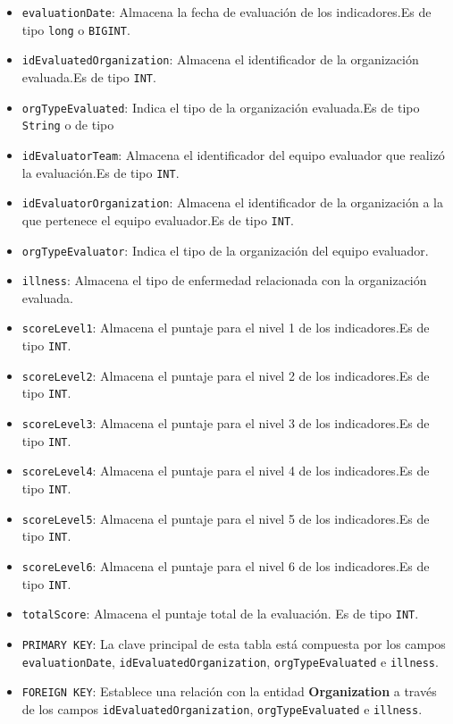 \begin{itemize}
    \begin{itemize}
      \item \texttt{evaluationDate}: Almacena la fecha de evaluación de los indicadores.Es de tipo \texttt{long} o \texttt{BIGINT}.
      \item \texttt{idEvaluatedOrganization}: Almacena el identificador de la organización evaluada.Es de tipo \texttt{INT}.
      \item \texttt{orgTypeEvaluated}: Indica el tipo de la organización evaluada.Es de tipo \texttt{String} o de tipo
      \item \texttt{idEvaluatorTeam}: Almacena el identificador del equipo evaluador que realizó la evaluación.Es de tipo \texttt{INT}.
      \item \texttt{idEvaluatorOrganization}: Almacena el identificador de la organización a la que pertenece el equipo evaluador.Es de tipo \texttt{INT}.
      \item \texttt{orgTypeEvaluator}: Indica el tipo de la organización del equipo evaluador.
      \item \texttt{illness}: Almacena el tipo de enfermedad relacionada con la organización evaluada.
      \item \texttt{scoreLevel1}: Almacena el puntaje para el nivel 1 de los indicadores.Es de tipo \texttt{INT}.
      \item \texttt{scoreLevel2}: Almacena el puntaje para el nivel 2 de los indicadores.Es de tipo \texttt{INT}.
      \item \texttt{scoreLevel3}: Almacena el puntaje para el nivel 3 de los indicadores.Es de tipo \texttt{INT}.
      \item \texttt{scoreLevel4}: Almacena el puntaje para el nivel 4 de los indicadores.Es de tipo \texttt{INT}.
      \item \texttt{scoreLevel5}: Almacena el puntaje para el nivel 5 de los indicadores.Es de tipo \texttt{INT}.
      \item \texttt{scoreLevel6}: Almacena el puntaje para el nivel 6 de los indicadores.Es de tipo \texttt{INT}.
      \item \texttt{totalScore}: Almacena el puntaje total de la evaluación. Es de tipo \texttt{INT}.
      \item \texttt{PRIMARY KEY}: La clave principal de esta tabla está compuesta por los campos \texttt{evaluationDate}, \texttt{idEvaluatedOrganization}, \texttt{orgTypeEvaluated} e \texttt{illness}.
      \item \texttt{FOREIGN KEY}: Establece una relación con la entidad \textbf{Organization} a través de los campos \texttt{idEvaluatedOrganization}, \texttt{orgTypeEvaluated} e \texttt{illness}.

\end{itemize}
\end{itemize}
